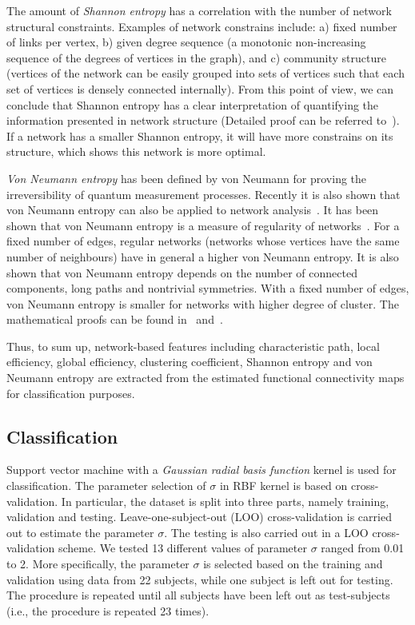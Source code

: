 The amount of \emph{Shannon entropy} has a correlation with the number of network structural constraints. Examples of network constrains include: a) fixed number of links per vertex, b) given degree sequence (a monotonic non-increasing sequence of the degrees of vertices in the graph), and c) community structure (vertices of the network can be easily grouped into sets of vertices such that each set of vertices is densely connected internally). From this point of view, we can conclude that Shannon entropy has a clear interpretation of quantifying the information presented in network structure (Detailed proof can be referred to~\cite{anand2009entropy}). If a network has a smaller Shannon entropy, it will have more constrains on its structure, which shows this network is more optimal. 

\emph{Von Neumann entropy} has been defined by von Neumann for proving the irreversibility of quantum measurement processes. Recently it is also shown that von Neumann entropy can also be applied to network analysis~\cite{passerini2008neumann}. It has been shown that von Neumann entropy is a measure of regularity of networks~\cite{passerini2008neumann}. For a fixed number of edges, regular networks (networks whose vertices have the same number of neighbours) have in general a higher von Neumann entropy. It is also shown that von Neumann entropy depends on the number of connected components, long paths and nontrivial symmetries. With a fixed number of edges, von Neumann entropy is smaller for networks with higher degree of cluster. The mathematical proofs can be found in~\cite{passerini2008neumann} and~\cite{anand2009entropy}.

Thus, to sum up, network-based features including characteristic path, local efficiency, global efficiency, clustering coefficient, Shannon entropy and von Neumann entropy are extracted from the estimated functional connectivity maps for classification purposes. 

\subsection{Classification}

Support vector machine with a \emph{Gaussian radial basis function} kernel is used for classification. The parameter selection of $\sigma$ in RBF kernel is based on cross-validation. In particular, the dataset is split into three parts, namely training, validation and testing. Leave-one-subject-out (LOO) cross-validation is carried out to estimate the parameter $\sigma$. The testing is also carried out in a LOO cross-validation scheme. We tested 13 different values of parameter $\sigma$ ranged from 0.01 to 2. More specifically, the parameter $\sigma$ is selected based on the training and validation using data from 22 subjects, while one subject is left out for testing. The procedure is repeated until all subjects have been left out as test-subjects (i.e., the procedure is repeated 23 times). 

